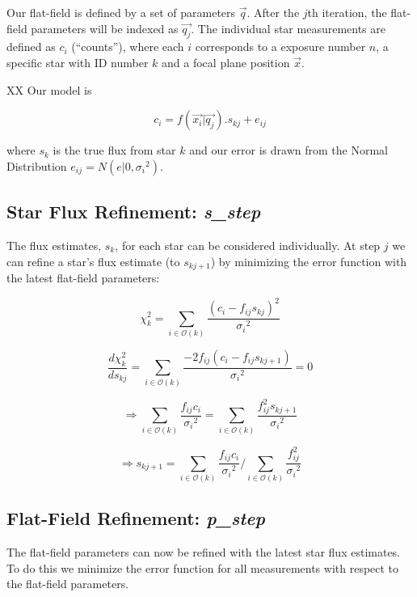 \documentclass[12pt,a4paper,twoside]{article}
\begin{document}
Our flat-field is defined by a set of parameters $\vec{q}$. After the $j$th iteration, the flat-field parameters will be indexed as $\vec{q_j}$. The individual star measurements are defined as $c_i$ (``counts''), where each $i$ corresponds to a exposure number $n$, a specific star with ID number $k$ and a focal plane position $\vec{x}$.

XX Our model is

\begin{equation}
c_i = f(\vec{x_i} | \vec{q_j}) . s_{kj} + e_{ij}
\end{equation}

where $s_k$ is the true flux from star $k$ and our error is drawn from the Normal Distribution $e_{ij} = N(e|0,{\sigma_i}^2)$.

\subsection{Star Flux Refinement: \textbf{\textit{s\_step}}}
The flux estimates, $s_k$, for each star can be considered individually. At step $j$ we can refine a star's flux estimate (to $s_{kj+1}$) by minimizing the error function with the latest flat-field parameters:

\begin{equation}
\chi^2_{k} = \sum_{i \in \mathcal{O}(k)} \frac{(c_i-f_{ij}s_{kj})^2}{{\sigma_i}^2}
\end{equation}

\begin{equation}
\frac{d\chi^2_{k}}{d s_{kj}} = \sum_{i \in \mathcal{O}(k)} \frac{-2 f_{ij} (c_i-f_{ij}s_{kj+1})}{{\sigma_i}^2} = 0
\end{equation}

\begin{equation}
\Rightarrow \sum_{i \in \mathcal{O}(k)} \frac{f_{ij} c_i}{{\sigma_i}^2}= \sum_{i \in \mathcal{O}(k)} \frac{f_{ij}^2 s_{kj+1}}{{\sigma_i}^2}
\end{equation}

\begin{equation}
\Rightarrow s_{kj+1} = {\sum_{i \in \mathcal{O}(k)} \frac{f_{ij} c_i}{{\sigma_i}^2}}/{\sum_{i \in \mathcal{O}(k)} \frac{f_{ij}^2}{{\sigma_i}^2}}
\end{equation}

\subsection{Flat-Field Refinement: \textbf{\textit{p\_step}}}
The flat-field parameters can now be refined with the latest star flux estimates. To do this we minimize the error function for all measurements with respect to the flat-field parameters.
\end{document}
